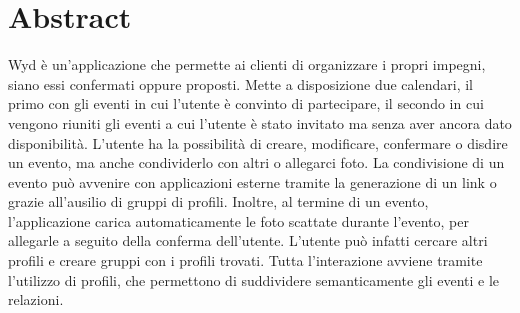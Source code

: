 \newpage
{}
\section{Abstract}

Wyd è un'applicazione che permette ai clienti di organizzare i propri impegni, siano essi confermati oppure proposti.\newline
Mette a disposizione due calendari, il primo con gli eventi in cui l'utente è convinto di partecipare, 
il secondo in cui vengono riuniti gli eventi a cui l'utente è stato invitato ma senza aver ancora dato disponibilità.\newline
L'utente ha la possibilità di creare, modificare, confermare o disdire un evento, ma anche condividerlo con altri o allegarci foto.
La condivisione di un evento può avvenire con applicazioni esterne tramite la generazione di un link o grazie all'ausilio di gruppi di profili.
Inoltre, al termine di un evento, l'applicazione carica automaticamente le foto scattate durante l'evento, per allegarle a seguito della conferma dell'utente.\newline  
L'utente può infatti cercare altri profili e creare gruppi con i profili trovati.\newline
Tutta l'interazione avviene tramite l'utilizzo di profili, che permettono di suddividere semanticamente gli eventi e le relazioni.\newline